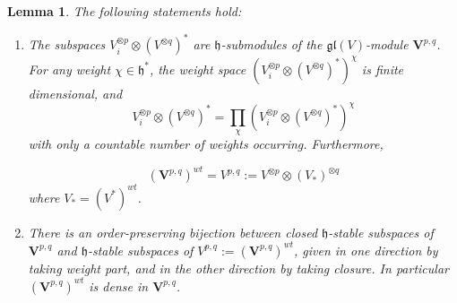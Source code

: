 \documentclass[12pt,reqno]{amsart}
\newtheorem{lem}[thm]{Lemma}
\theoremstyle{definition}
\theoremstyle{remark}
\begin{document}
	\begin{lem} \label{lem: weightpart}
	The following statements hold:
	\begin{enumerate}
	    \item[(a)]\label{product}
	    The subspaces $V_i ^{\otimes p}\otimes (V^{\otimes q})^*$ are $\mathfrak{h}$-submodules of the $\mathfrak{gl}(V)$-module $\mathbf{V}^{p,q}$. For any weight $\chi\in \mathfrak{h}^\ast$, the weight space $(V_i ^{\otimes p}\otimes (V^{\otimes q})^*)^\chi$ is finite dimensional, and 
	$$
	V_i ^{\otimes p}\otimes (V^{\otimes q})^* = \prod_{\chi} (V_i ^{\otimes p}\otimes (V^{\otimes q})^*)^\chi
	$$
	with only a countable number of weights occurring. Furthermore, 
	
	$$(\mathbf{V}^{p,q})^{wt} = V^{p,q} := V^{\otimes p} \otimes (V_\ast)^{\otimes q}  $$ 
	where $V_\ast = (V^\ast)^{wt}$.
	
	\item[(b)] \label{bij}
	There is an order-preserving bijection between closed $\mathfrak{h}$-stable subspaces of $\mathbf{V}^{p,q}$ and $\mathfrak{h}$-stable subspaces of ${V}^{p,q} := (\mathbf{V}^{p,q})^{wt}$, given in one direction by taking
	weight part, and in the other direction by taking closure. In particular $(\mathbf{V}^{p,q})^{wt}$ is dense in
	$\mathbf{V}^{p,q}$.
	\end{enumerate}
	
	
	\end{lem}
	
\end{document}

